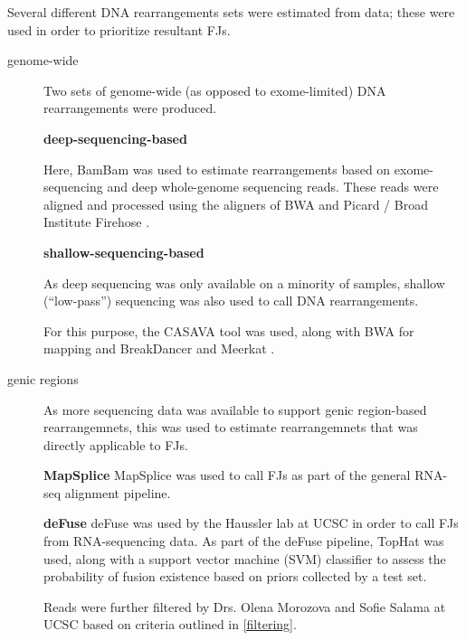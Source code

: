 Several different DNA rearrangements sets were estimated from data;
these were used in order to prioritize resultant FJs.
\begin{description}
\item[genome-wide]
  Two sets of genome-wide (as opposed to exome-limited) DNA
  rearrangements were produced.

  
  \textbf{deep-sequencing-based}

  
Here, BamBam\cite{sanborn_double_2013} was used to estimate
rearrangements based on exome-sequencing and deep whole-genome
sequencing reads. These reads were aligned and processed using the aligners
of BWA  and Picard / Broad Institute
Firehose .
  
\textbf{shallow-sequencing-based}

As deep sequencing was only available on a minority of samples,
shallow (``low-pass'') sequencing was also used to call DNA
rearrangements.

For this purpose, the CASAVA  tool was used, along with BWA for mapping
and BreakDancer\cite{chen_breakdancer_2009} and Meerkat .




\item[genic regions]

As more sequencing data was available to support genic region-based
rearrangemnets, this was used to estimate rearrangemnets that was
directly applicable to FJs.

\textbf{MapSplice}
MapSplice\cite{wang_mapsplice:_2010} was used to call FJs as part of
the general RNA-seq alignment pipeline.


\textbf{deFuse}
deFuse\cite{mcpherson_defuse:_2011} was used by the Haussler lab at UCSC in order to call FJs from
RNA-sequencing data. As part of the deFuse pipeline, TopHat
was used, along with a support vector machine (SVM) classifier to
assess the probability of fusion existence based on priors collected
by a test set.

Reads were further filtered by Drs. Olena Morozova and Sofie Salama at
UCSC based on criteria outlined in \ref{filtering}. 


\end{description}
